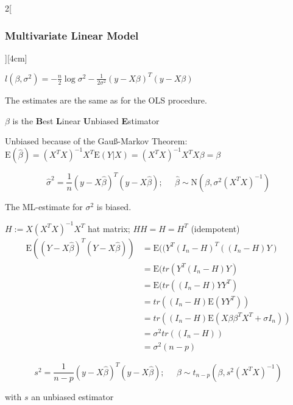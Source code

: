 \documentclass[8pt]{extarticle}
\begin{document}
\begin{multicols}{2}[\subsubsection{Multivariate Linear Model}][4cm]
\begin{Proof}
$l(\beta,\sigma^2) = -\frac{n}{2}\log\sigma^2 -\frac{1}{2\sigma^2}(y-X\beta)^T(y-X\beta)$
\end{Proof}
The estimates are the same as for the OLS procedure.

\noindent $\beta$ is the \textbf{B}est \textbf{L}inear \textbf{U}nbiased \textbf{E}stimator

\begin{Proof}
Unbiased because of the Gauß-Markov Theorem:
$\mathrm{E}(\hat{\beta}) = (X^TX)^{-1}X^T\mathrm{E}(Y|X) = (X^TX)^{-1}X^TX\beta = \beta$
\end{Proof}
$$\hat{\sigma}^2 = \frac{1}{n}(y-X\hat{\beta})^T(y-X\hat{\beta});\;\;\;\;\; \hat{\beta} \sim \mathrm{N}(\beta,\sigma^2(X^TX)^{-1})$$

The ML-estimate for $\sigma^2$ is biased.

\begin{Proof}
$H{:=}X(X^TX)^{-1}X^T$ hat matrix; $HH{=}H{=}H^T$ (idempotent)
\begin{align*}
\mathrm{E}((Y{-}X\hat{\beta})^T(Y{-}X\hat{\beta})) &= \mathrm{E}((Y^T(I_n{-}H)^T((I_n{-}H)Y)\\
&= \mathrm{E}(tr(Y^T(I_n{-}H)Y)\\
&= \mathrm{E}(tr((I_n{-}H)YY^T)\\
&= tr((I_n{-}H)\mathrm{E}(YY^T))\\
&= tr((I_n{-}H)\mathrm{E}(X\beta\beta^TX^T + \sigma I_n))\\
&= \sigma^2tr((I_n{-}H))\\
&= \sigma^2 (n-p)
\end{align*}
\end{Proof}

$$s^2 = \frac{1}{n-p}(y-X\hat{\beta})^T(y-X\hat{\beta});\;\;\;\;\; \hat{\beta} \sim t_{n-p}(\beta,s^2(X^TX)^{-1})$$

with $s$ an unbiased estimator

\end{multicols}

\end{document}
